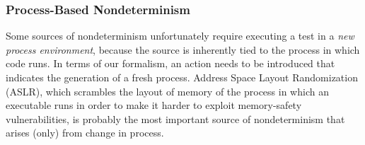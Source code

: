 \subsubsection{Process-Based Nondeterminism}

\label{sec:pnondet}

Some sources of nondeterminism unfortunately require executing a test in a \emph{new
process environment}, because the source is inherently tied to the
process in which code runs.  In terms of our formalism, an
action needs to be introduced that indicates the generation of a fresh
process.  Address Space Layout Randomization (ASLR), which scrambles the layout of memory of the process in which
an executable runs in order to make it harder to exploit memory-safety
vulnerabilities, is probably the most
important source of nondeterminism that arises (only) from change in
process.  

